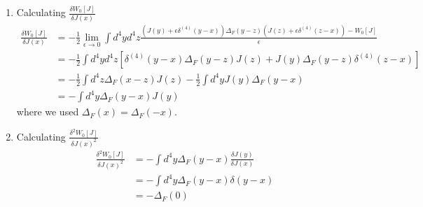 \documentclass[10pt,a4paper]{book}
\theoremstyle{definition}
\begin{document}
\begin{enumerate}
\item Calculating $\frac{\delta W_0[J]}{\delta J(x)}$
\begin{align}
    \frac{\delta W_0[J]}{\delta J(x)}&=-\frac{1}{2}\lim_{\epsilon\rightarrow0}\int d^4yd^4z\frac{\left(J(y)+\epsilon\delta^{(4)}(y-x)\right)\Delta_F(y-z)\left(J(z)+\epsilon\delta^{(4)}(z-x)\right)-W_0[J]}{\epsilon}\\
    &=-\frac{1}{2}\int d^4yd^4z \left[\delta^{(4)}(y-x)\Delta_F(y-z)J(z)+J(y)\Delta_F(y-z)\delta^{(4)}(z-x)\right]\\
    &=-\frac{1}{2}\int d^4z\Delta_F(x-z)J(z)-\frac{1}{2}\int d^4yJ(y)\Delta_F(y-x)\\
    &=-\int d^4y\Delta_F(y-x)J(y)
\end{align}
where we used $\Delta_F(x)=\Delta_F(-x)$.
\item Calculating $\frac{\delta^2 W_0[J]}{\delta J(x)^2}$
\begin{align}
    \frac{\delta^2 W_0[J]}{\delta J(x)^2}
    &=-\int d^4y\Delta_F(y-x)\frac{\delta J(y)}{\delta J(x)}\\
    &=-\int d^4y\Delta_F(y-x)\delta(y-x)\\
    &=-\Delta_F(0)
\end{align}


\end{enumerate}
\end{document}

